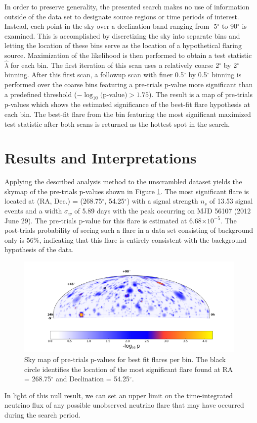 \documentclass[manuscript]{aastex}
\begin{document}
In order to preserve generality, the presented search makes no use of information outside of the data set to designate source regions or time periods of interest. Instead, each point in the sky over a declination band ranging from -5$^{\circ}$ to 90$^{\circ}$ is examined. This is accomplished by discretizing the sky into separate bins and letting the location of these bins serve as the location of a hypothetical flaring source. Maximization of the likelihood is then performed to obtain a test statistic $\hat{\lambda}$ for each bin. The first iteration of this scan uses a relatively coarse 2$^{\circ}$ by 2$^{\circ}$ binning. After this first scan, a followup scan with finer 0.5$^{\circ}$ by 0.5$^{\circ}$ binning is performed over the coarse bins featuring a pre-trials p-value more significant than a predefined threshold ($-\log_{10}($p-value$) > 1.75$). The result is a map of pre-trials p-values which shows the estimated significance of the best-fit flare hypothesis at each bin. The best-fit flare from the bin featuring the most significant maximized test statistic after both scans is returned as the hottest spot in the search.

\section{Results and Interpretations}
Applying the described analysis method to the unscrambled dataset yields the skymap of the pre-trials p-values shown in Figure \ref{fig:RealSkyMap}. The most significant flare is located at (RA, Dec.) = (268.75$^{\circ}$, 54.25$^{\circ}$) with a signal strength $n_s$ of 13.53 signal events and a width $\sigma_w$ of 5.89 days with the peak occurring on MJD 56107 (2012 June 29). The pre-trials p-value for this flare is estimated at 6.68$\times 10^{-5}$. The post-trials probability of seeing such a flare in a data set consisting of background only is 56$\%$, indicating that this flare is entirely consistent with the background hypothesis of the data.
\begin{figure}[ht]
  \begin{center}
    \includegraphics[width=1.0\textwidth,keepaspectratio]{plots/RealResultSkyMap_Cut.png}
  \end{center}
  \caption[Results Sky Map]{Sky map of pre-trials p-values for best fit flares per bin. The black circle identifies the location of the most significant flare found at RA = 268.75$^\circ$ and Declination = 54.25$^\circ$.}
  \label{fig:RealSkyMap}
\end{figure}
In light of this null result, we can set an upper limit on the time-integrated neutrino flux of any possible unobserved neutrino flare that may have occurred during the search period.
\end{document}
